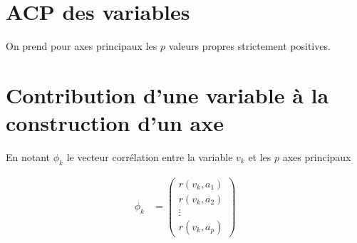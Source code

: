 


    \section{ACP des variables}
    
    On prend pour axes principaux les $p$ valeurs propres strictement positives.

    \section{Contribution d'une variable à la construction d'un axe}
    
    En notant $\phi_k$ le vecteur corrélation entre la variable $v_k$ et les $p$ axes principaux

    \begin{align*}
        \phi_k &= \begin{pmatrix} r(v_k, a_1) \\ r(v_k, a_2) \\ \vdots \\ r(v_k, a_p) \end{pmatrix}  \\
    \end{align*}




